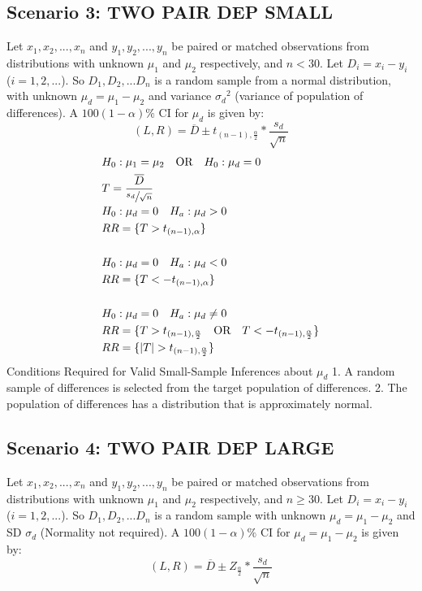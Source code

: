 \documentclass[fontsize=6pt, paper=a4]{scrartcl}
\begin{document}
\begin{multicols*}{4}
{\subsection{Scenario 3: TWO PAIR DEP SMALL}
Let $x_1,x_2,...,x_n$ and $y_1,y_2,...,y_n$ be paired or matched observations from distributions with unknown $\mu_1$ and $\mu_2$ respectively, and $n<30$. Let $D_i=x_i-y_i$ ($i=1,2,...$). So $D_1, D_2,...D_n$ is a random sample from a normal distribution, with unknown $\mu_d=\mu_1-\mu_2$ and variance ${\sigma_d}^2$ (variance of population of differences). A $100(1-\alpha)\%$ CI for $\mu_d$ is given by:
\begin{equation}
	(L,R)=\overline{D}\pm t_{(n-1), \frac{\alpha}{2}}*\frac{s_d}{\sqrt{n}}
\end{equation}
\begin{align}
	&H_0:\mu_1=\mu_2 \quad \textrm{OR} \quad H_0:\mu_d=0\\ 
	&T=\frac{\overline{D}}{\sfrac{s_d}{\sqrt{n}}}\\
	&H_0:\mu_d=0 \quad H_a:\mu_d >0\\
	&RR= \{ T> t_{(n-1), \alpha}\}\\ \\
	&H_0:\mu_d=0 \quad H_a:\mu_d <0\\
	&RR= \{ T< -t_{(n-1), \alpha}\}\\ \\
	&H_0:\mu_d=0 \quad H_a:\mu_d \neq 0\\
	&RR= \{ T> t_{(n-1), \frac{\alpha}{2}} \quad \textrm{OR} \quad T<- t_{(n-1), \frac{\alpha}{2}}\} \\
	&RR= \{ \left|T\right|> t_{(n-1), \frac{\alpha}{2}}\}
\end{align}
Conditions Required for Valid Small-Sample Inferences about $\mu_d$
1. A random sample of differences is selected from the target population of
differences.
2. The population of differences has a distribution that is approximately normal.

\subsection{Scenario 4: TWO PAIR DEP LARGE}
Let $x_1,x_2,...,x_n$ and $y_1,y_2,...,y_n$ be paired or matched observations from distributions with unknown $\mu_1$ and $\mu_2$ respectively, and $n\geq30$. Let $D_i=x_i-y_i$ ($i=1,2,...$). So $D_1, D_2,...D_n$ is a random sample with unknown $\mu_d=\mu_1-\mu_2$ and SD ${\sigma_d}$ (Normality not required). A $100(1-\alpha)\%$ CI for $\mu_d=\mu_1-\mu_2$ is given by:
\begin{equation}
	(L,R)=\overline{D}\pm Z_{\frac{\alpha}{2}}*\frac{s_d}{\sqrt{n}}
\end{equation}

}
\end{multicols*}
\end{document}
